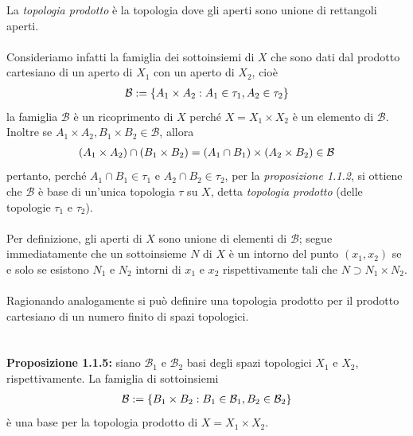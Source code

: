 \documentclass{article}
\begin{document}
La \textit{topologia prodotto} è la topologia dove gli aperti sono unione di rettangoli aperti. \\ \\
Consideriamo infatti la famiglia dei sottoinsiemi di $X$ che sono dati dal prodotto cartesiano di un aperto di $X_1$ con un aperto di $X_2$, cioè
\begin{gather}
    \mathcal{B} := \{ A_1 \times A_2 : A_1 \in \tau_1, A_2 \in \tau_2 \} \notag
\end{gather}
la famiglia $\mathcal{B}$ è un ricoprimento di $X$ perché $X = X_1 \times X_2$ è un elemento di $\mathcal{B}$. Inoltre se $A_1 \times A_2, B_1 \times B_2 \in \mathcal{B}$, allora
\begin{gather}
    (A_1 \times A_2) \cap (B_1 \times B_2) = (A_1 \cap B_1) \times (A_2 \times B_2) \in \mathcal{B} \notag
\end{gather}
pertanto, perché $A_1 \cap B_1 \in \tau_1$ e $A_2 \cap B_2 \in \tau_2$, per la \textit{proposizione 1.1.2}, si ottiene che $\mathcal{B}$ è base di un'unica topologia $\tau$ su $X$, detta \textit{topologia prodotto} (delle topologie $\tau_1$ e $\tau_2$). \\ \\
Per definizione, gli aperti di $X$ sono unione di elementi di $\mathcal{B}$; segue immediatamente che un sottoinsieme $N$ di $X$ è un intorno del punto $(x_1, x_2)$ se e solo se esistono $N_1$ e $N_2$ intorni di $x_1$ e $x_2$ rispettivamente tali che $N \supset N_1 \times N_2$. \\ \\
Ragionando analogamente si può definire una topologia prodotto per il prodotto cartesiano di un numero finito di spazi topologici. \\ \\ \\
\textbf{Proposizione 1.1.5:} siano $\mathcal{B}_1$ e $\mathcal{B}_2$ basi degli spazi topologici $X_1$ e $X_2$, rispettivamente. La famiglia di sottoinsiemi
\begin{gather}
    \mathcal{B} := \{ B_1 \times B_2 : B_1 \in \mathcal{B}_1, B_2 \in \mathcal{B}_2 \} \notag
\end{gather}
è una base per la topologia prodotto di $X = X_1 \times X_2$. \\
\end{document}
